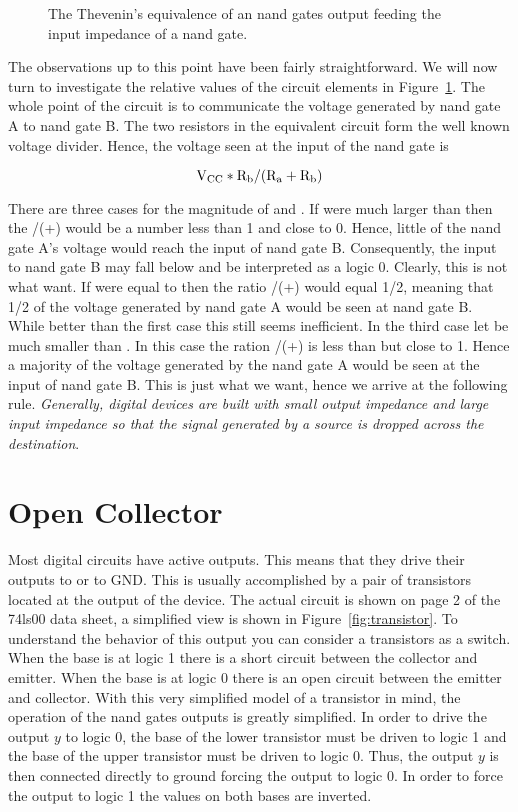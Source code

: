 \begin{figure}[ht]
\caption{The Thevenin's equivalence of an nand gates output feeding the
input impedance of a nand gate.}
\label{fig:impedance}
\end{figure}

The observations up to this point have been fairly straightforward.
We will now turn to investigate the relative values of the circuit
elements in Figure~\ref{fig:impedance}.  The whole point of the
circuit is to communicate the voltage generated by nand gate A to
nand gate B.  The two resistors in the equivalent circuit form the
well known voltage divider.  Hence, the voltage seen at the input
of the nand gate is 

	$$ {\rm V}_{\rm CC}  *
		{\rm R}_{\rm b}  / 
		( {\rm R}_{\rm a} + {\rm R}_{\rm b} ) $$


There are three
cases for the magnitude of \Ra and \Rb.  If \Ra were much larger
than \Rb then the \Rb/(\Ra+\Rb) would be a number less than 1 
and close to 0.  Hence, little of the nand gate A's voltage 
would reach the input of nand gate B.  Consequently, the input
to nand gate B may fall below \VIL and be interpreted as a logic
0.  Clearly, this is not
what want.  If \Ra were equal to \Rb then the ratio \Rb/(\Ra+\Rb) 
would equal 1/2, meaning that 1/2 of the voltage generated by nand
gate A would be seen at nand gate B.  While better than the first
case this still seems inefficient.  In the third case let
\Ra be much smaller than \Rb.  In this case the ration \Rb/(\Ra+\Rb)
is less than but close to 1.  Hence a majority of the voltage
generated by the nand gate A would be seen at the input of nand gate
B. This is just what we want, hence we arrive at the following
rule. \textit{ Generally, digital devices are built with small output
impedance and large input impedance so that the signal
generated by a source is dropped across the destination}.

\section{Open Collector}
Most digital circuits have active outputs.  This means that they drive 
their outputs to \VCC or to GND.  This is usually accomplished 
by a pair of transistors located at the output of the device.  The 
actual circuit is shown on page 2 of the 74ls00 data sheet,
a simplified view is shown in Figure~\ref{fig:transistor}.  To 
understand the behavior of this output you can consider 
a transistors as a switch.  When the base is at logic 1 there is
a short circuit between the collector and emitter.  When the base is 
at logic 0 there is an open circuit between the emitter and
collector.  With this very simplified model of a transistor in mind,
the operation of the nand gates outputs is greatly simplified.  In
order to drive the output $y$ to logic 0, the base of the lower 
transistor must be driven to logic 1 and the base of the upper
transistor must be driven to logic 0.  Thus, the output $y$ is then
connected directly to ground forcing the output to logic 0.  In order
to force the output to logic 1 the values on both bases are inverted.

